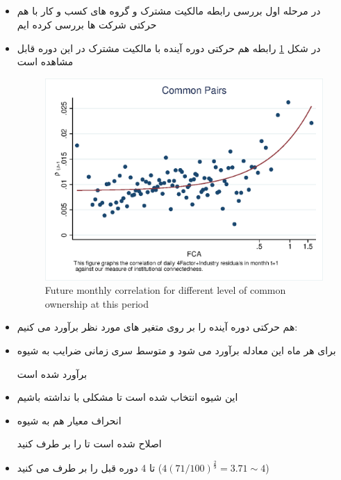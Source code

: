 \documentclass[12pt, a4paper]{article}
\begin{document}
\subsection{}
\label{Forecasting Co-movement}

\begin{itemize}
	\item 
	در مرحله اول بررسی رابطه مالکیت مشترک و گروه های کسب و کار با هم حرکتی شرکت ها بررسی کرده ایم
	\item 
	در شکل 
	\ref{mcorr50}
	رابطه هم حرکتی دوره آینده با مالکیت مشترک در این دوره قابل مشاهده است
	 \begin{figure}[htbp]
		\centering  
		\centering
		\includegraphics[width=0.7\linewidth]{"Output/mcorr50.eps"} 
		\caption{Future monthly correlation for different level of common ownership at this period }
		\label{mcorr50}
	\end{figure}
	\item 
	هم حرکتی دوره آینده را بر روی متغیر های مورد نظر برآورد می کنیم:
	
	
	\item
	برای هر ماه این معادله برآورد می شود و متوسط سری زمانی ضرایب به شیوه
	
	برآورد شده است
	\item
	این شیوه انتخاب شده است تا مشکلی با 
	نداشته باشیم
	\item
	انحراف معیار هم به شیوه
	
	اصلاح شده است تا 
	را بر طرف کنید
	\item
	تا 4 دوره قبل را بر طرف می کنید
	($ 4(71/100)^{\frac{2}{9}} = 3.71 \sim 4 $)
	
	
\end{itemize}
\end{document}
